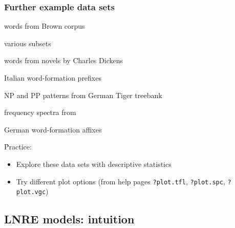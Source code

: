 \documentclass[t]{beamer} %
\begin{document}
\begin{frame}[fragile]
  \frametitle{Further example data sets}

  \begin{description}[labelwidth=5cm]
  \item[\texttt{?Brown}] words from Brown corpus
  \item[\texttt{?BrownSubsets}] various subsets
  \item[\texttt{?Dickens}] words from novels by Charles Dickens
  \item[\texttt{?ItaPref}] Italian word-formation prefixes
  \item[\texttt{?TigerNP}] NP and PP patterns from German Tiger treebank
  \item[\texttt{?Baayen2001}] frequency spectra from \citet{Baayen:01}
  \item[\texttt{?EvertLuedeling2001}] German word-formation affixes \citep[manually corrected data from][]{Evert:Luedeling:01}
  \end{description}

  \h{Practice:}
  \begin{itemize}
  \item Explore these data sets with descriptive statistics
  \item Try different plot options (from help pages \texttt{?plot.tfl}, \texttt{?plot.spc}, \texttt{?plot.vgc})
  \end{itemize}
\end{frame}






\subsection{LNRE models: intuition}
\end{document}

